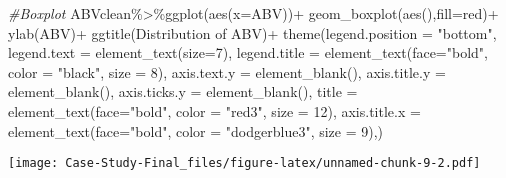\documentclass[
]{article}
\newenvironment{Shaded}{\begin{snugshade}}{\end{snugshade}}
\newcommand{\AttributeTok}[1]{\textcolor[rgb]{0.77,0.63,0.00}{#1}}
\newcommand{\CommentTok}[1]{\textcolor[rgb]{0.56,0.35,0.01}{\textit{#1}}}
\newcommand{\DecValTok}[1]{\textcolor[rgb]{0.00,0.00,0.81}{#1}}
\newcommand{\FunctionTok}[1]{\textcolor[rgb]{0.00,0.00,0.00}{#1}}
\newcommand{\NormalTok}[1]{#1}
\newcommand{\OtherTok}[1]{\textcolor[rgb]{0.56,0.35,0.01}{#1}}
\newcommand{\SpecialCharTok}[1]{\textcolor[rgb]{0.00,0.00,0.00}{#1}}
\newcommand{\StringTok}[1]{\textcolor[rgb]{0.31,0.60,0.02}{#1}}
\begin{document}
\begin{Shaded}
\begin{Highlighting}[]
\CommentTok{\#Boxplot}
\NormalTok{ABVclean}\SpecialCharTok{\%\textgreater{}\%}\FunctionTok{ggplot}\NormalTok{(}\FunctionTok{aes}\NormalTok{(}\AttributeTok{x=}\NormalTok{ABV))}\SpecialCharTok{+}
  \FunctionTok{geom\_boxplot}\NormalTok{(}\FunctionTok{aes}\NormalTok{(),}\AttributeTok{fill=}\StringTok{\textquotesingle{}red\textquotesingle{}}\NormalTok{)}\SpecialCharTok{+}
  \FunctionTok{ylab}\NormalTok{(}\StringTok{\textquotesingle{}ABV\textquotesingle{}}\NormalTok{)}\SpecialCharTok{+}
  \FunctionTok{ggtitle}\NormalTok{(}\StringTok{\textquotesingle{}Distribution of ABV\textquotesingle{}}\NormalTok{)}\SpecialCharTok{+}
  \FunctionTok{theme}\NormalTok{(}\AttributeTok{legend.position =} \StringTok{"bottom"}\NormalTok{,}
        \AttributeTok{legend.text =} \FunctionTok{element\_text}\NormalTok{(}\AttributeTok{size=}\DecValTok{7}\NormalTok{),}
        \AttributeTok{legend.title =} \FunctionTok{element\_text}\NormalTok{(}\AttributeTok{face=}\StringTok{"bold"}\NormalTok{, }\AttributeTok{color =} \StringTok{"black"}\NormalTok{, }\AttributeTok{size =} \DecValTok{8}\NormalTok{),}
        \AttributeTok{axis.text.y =} \FunctionTok{element\_blank}\NormalTok{(),}
        \AttributeTok{axis.title.y =} \FunctionTok{element\_blank}\NormalTok{(),}
        \AttributeTok{axis.ticks.y =} \FunctionTok{element\_blank}\NormalTok{(),}
        \AttributeTok{title =} \FunctionTok{element\_text}\NormalTok{(}\AttributeTok{face=}\StringTok{"bold"}\NormalTok{, }\AttributeTok{color =} \StringTok{"red3"}\NormalTok{, }\AttributeTok{size =} \DecValTok{12}\NormalTok{),}
        \AttributeTok{axis.title.x =} \FunctionTok{element\_text}\NormalTok{(}\AttributeTok{face=}\StringTok{"bold"}\NormalTok{, }\AttributeTok{color =} \StringTok{"dodgerblue3"}\NormalTok{, }\AttributeTok{size =} \DecValTok{9}\NormalTok{),)}
\end{Highlighting}
\end{Shaded}

\texttt{[image: Case-Study-Final\_files/figure-latex/unnamed-chunk-9-2.pdf]}

\begin{Shaded}
\end{Shaded}
\end{document}
